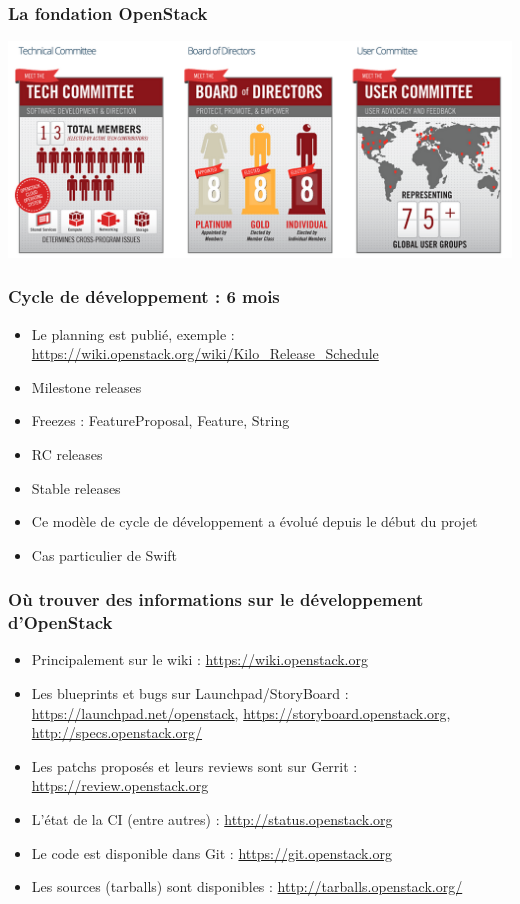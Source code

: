   \begin{frame}
    \frametitle{La fondation OpenStack}
      \includegraphics[width=\textwidth]{images/foundation.png}
  \end{frame}

  \begin{frame}
    \frametitle{Cycle de développement : 6 mois}
    \begin{itemize}
      \item Le planning est publié, exemple : \url{https://wiki.openstack.org/wiki/Kilo_Release_Schedule}
      \item Milestone releases
      \item Freezes : FeatureProposal, Feature, String
      \item RC releases
      \item Stable releases
      \item Ce modèle de cycle de développement a évolué depuis le début du projet
      \item Cas particulier de Swift
    \end{itemize}
  \end{frame}

  \begin{frame}
    \frametitle{Où trouver des informations sur le développement d'OpenStack}
    \begin{itemize}
      \item Principalement sur le wiki : \url{https://wiki.openstack.org}
      \item Les blueprints et bugs sur Launchpad/StoryBoard : \url{https://launchpad.net/openstack}, \url{https://storyboard.openstack.org}, \url{http://specs.openstack.org/}
      \item Les patchs proposés et leurs reviews sont sur Gerrit : \url{https://review.openstack.org}
      \item L'état de la CI (entre autres) : \url{http://status.openstack.org}
      \item Le code est disponible dans Git : \url{https://git.openstack.org}
      \item Les sources (tarballs) sont disponibles : \url{http://tarballs.openstack.org/}
    \end{itemize}
  \end{frame}

